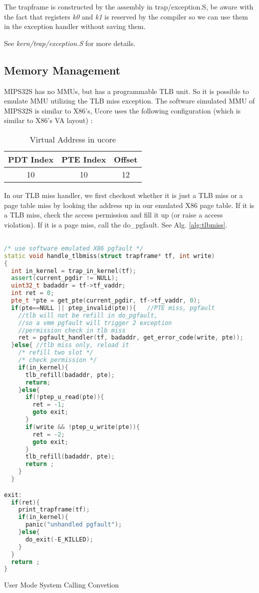 \documentclass[a4paper]{article}
\begin{document}
The trapframe is constructed by the assembly in trap/exception.S, be aware with the fact that
registers \emph{k0} and \emph{k1} is reserved by the compiler so we can use them in the exception
handler without saving them.

See \emph{kern/trap/exception.S} for more details.

\subsection{Memory Management}
\label{sec:mm}
MIPS32S has no MMUs, but has a programmable TLB unit. So
it is possible to emulate MMU utilizing the TLB miss exception.
The software simulated MMU of MIPS32S is similar to X86's, 
Ucore uses the following 
configuration (which is similar to X86's VA layout) :

\begin{table}[H]
\centering
\begin{tabular}{|c|c|c|}
\hline
PDT Index & PTE Index & Offset \\
\hline
10 & 10 & 12 \\
\hline
\end{tabular}
\caption{Virtual Address in ucore}
\label{tab:va_layout}
\end{table}

In our TLB miss handler, we first checkout whether it is just a TLB miss
or a page table miss by looking the address up in our emulated X86 page table.
If it is a TLB miss, check the access permission and fill it up (or raise a
access violation). If it is a page miss, call the do\_pgfault. See Alg. \ref{alg:tlbmiss}.


\begin{algorithm}[h]

 \begin{lstlisting}[language={C++}]

/* use software emulated X86 pgfault */
static void handle_tlbmiss(struct trapframe* tf, int write)
{
  int in_kernel = trap_in_kernel(tf);
  assert(current_pgdir != NULL);
  uint32_t badaddr = tf->tf_vaddr;
  int ret = 0;
  pte_t *pte = get_pte(current_pgdir, tf->tf_vaddr, 0);
  if(pte==NULL || ptep_invalid(pte)){   //PTE miss, pgfault
    //tlb will not be refill in do_pgfault,
    //so a vmm pgfault will trigger 2 exception
    //permission check in tlb miss
    ret = pgfault_handler(tf, badaddr, get_error_code(write, pte));
  }else{ //tlb miss only, reload it
    /* refill two slot */
    /* check permission */
    if(in_kernel){
      tlb_refill(badaddr, pte); 
      return;
    }else{
      if(!ptep_u_read(pte)){
        ret = -1;
        goto exit;
      }
      if(write && !ptep_u_write(pte)){
        ret = -2;
        goto exit;
      }
      tlb_refill(badaddr, pte);
      return ;
    }
  }

exit:
  if(ret){
    print_trapframe(tf);
    if(in_kernel){
      panic("unhandled pgfault");
    }else{
      do_exit(-E_KILLED);
    }
  }
  return ;
}

\end{lstlisting}
\caption{User Mode System Calling Convetion}
\label{alg:tlbmiss}
\end{algorithm}
\end{document}
